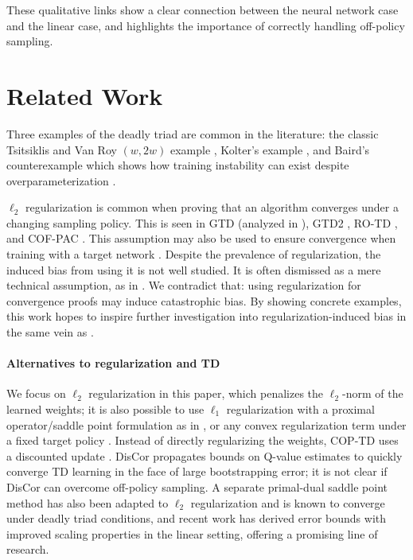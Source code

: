 These qualitative links show a clear connection between the neural network case and the linear case, and highlights the importance of correctly handling off-policy sampling.


\section{Related Work}
\label{sec:relatedwork}
Three examples of the deadly triad are common in the literature: the classic Tsitsiklis and Van Roy $(w, 2w)$ example \cite[p.~260]{sutton2020reinforcement}, Kolter's example \cite{kolter2011fixed}, and Baird's counterexample which shows how training instability can exist despite overparameterization \cite{baird1993counterexample}.

$\ell_2$ regularization is common when proving that an algorithm converges under a changing sampling policy. This is seen in GTD (analyzed in \cite{yu2017convergence}), GTD2 \cite{sutton2009fast}, RO-TD \cite{mahadevan2014proximal}, and COF-PAC \cite{zhang2020provably}. This assumption may also be used to ensure convergence when training with a target network \cite{zhang2021breaking}. Despite the prevalence of regularization, the induced bias from using it is not well studied. It is often dismissed as a mere technical assumption, as in \cite{diddigi2019convergent}. We contradict that: using regularization for convergence proofs may induce catastrophic bias. By showing concrete examples, this work hopes to inspire further investigation into regularization-induced bias in the same vein as \cite{yu2017convergence}.

\paragraph{Alternatives to regularization and TD}
We focus on $\ell_2$ regularization in this paper, which penalizes the $\ell_2$-norm of the learned weights; it is also possible to use $\ell_1$ regularization with a proximal operator/saddle point formulation as in \cite{mahadevan2014proximal}, or any convex regularization term under a fixed target policy \cite{yu2017convergence}. Instead of directly regularizing the weights, COP-TD uses a discounted update \cite{gelada2019off}. DisCor \cite{kumar2020discor} propagates bounds on Q-value estimates to quickly converge TD learning in the face of large bootstrapping error; it is not clear if DisCor can overcome off-policy sampling. A separate primal-dual saddle point method has also been adapted to $\ell_2$ regularization \cite{du2017stochastic} and is known to converge under deadly triad conditions, and recent work \cite{chaudhuri2022first} has derived error bounds with improved scaling properties in the linear setting, offering a promising line of research.

